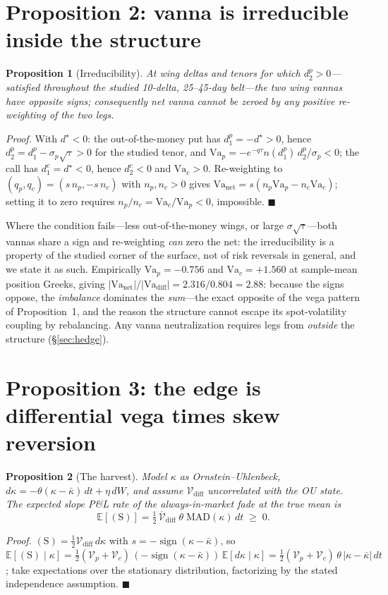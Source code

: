 \documentclass[11pt]{article}
\newcommand{\Va}{\mathrm{Va}}
\newtheorem{prop}{Proposition}
\begin{document}
\section{Proposition 2: vanna is irreducible inside the structure}
\begin{prop}[Irreducibility]
At wing deltas and tenors for which $d_2^p > 0$---satisfied throughout the studied 10-delta,
25--45-day belt---the two wing vannas have opposite signs; consequently net vanna cannot be
zeroed by any
positive re-weighting of the two legs.
\end{prop}
\emph{Proof.} With $d^\star < 0$: the out-of-the-money put has $d_1^p = -d^\star > 0$, hence
$d_2^p = d_1^p - \sigma_p\sqrt{\tau} > 0$ for the studied tenor, and
$\Va_p = -e^{-q\tau} n(d_1^p)\, d_2^p / \sigma_p < 0$; the call has $d_1^c = d^\star < 0$,
hence $d_2^c < 0$ and $\Va_c > 0$. Re-weighting to $(q_p, q_c) = (s\,n_p, -s\,n_c)$ with
$n_p, n_c > 0$ gives $\Va_{\mathrm{net}} = s(n_p \Va_p - n_c \Va_c)$; setting it to zero
requires $n_p / n_c = \Va_c / \Va_p < 0$, impossible. $\blacksquare$

Where the condition fails---less out-of-the-money wings, or large $\sigma\sqrt{\tau}$---both
vannas share a sign and re-weighting \emph{can} zero the net: the irreducibility is a property
of the studied corner of the surface, not of risk reversals in general, and we state it as
such. Empirically $\Va_p = -0.756$ and $\Va_c = +1.560$ at sample-mean position Greeks, giving
$|\Va_{\mathrm{net}}| / |\Va_{\mathrm{diff}}| = 2.316/0.804 = 2.88$: because the signs oppose, the
\emph{imbalance} dominates the \emph{sum}---the exact opposite of the vega pattern of
Proposition~1, and the reason the structure cannot escape its spot-volatility coupling by
rebalancing. Any vanna neutralization requires legs from \emph{outside} the structure
(\S\ref{sec:hedge}).

\section{Proposition 3: the edge is differential vega times skew reversion}
\begin{prop}[The harvest]
Model $\kappa$ as Ornstein--Uhlenbeck, $d\kappa = -\theta(\kappa - \bar\kappa)\,dt +
\eta\,dW$, and assume $\mathcal V_{\mathrm{diff}}$ uncorrelated with the OU state. The
expected slope P\&L rate of the always-in-market fade at the true mean is
\[ \mathbb E[(\mathrm S)] = \tfrac12\,\overline{\mathcal V}_{\mathrm{diff}}\;\theta\;
   \mathrm{MAD}(\kappa)\,dt \;\ge\; 0. \]
\end{prop}
\emph{Proof.} $(\mathrm S) = \tfrac12 \mathcal V_{\mathrm{diff}}\, d\kappa$ with
$s = -\operatorname{sign}(\kappa - \bar\kappa)$, so
$\mathbb E[(\mathrm S) \mid \kappa] = \tfrac12 (\mathcal V_p + \mathcal V_c)\,
(-\operatorname{sign}(\kappa - \bar\kappa))\, \mathbb E[d\kappa \mid \kappa] =
\tfrac12 (\mathcal V_p + \mathcal V_c)\, \theta\, |\kappa - \bar\kappa|\, dt$; take
expectations over the stationary distribution, factorizing by the stated independence
assumption. $\blacksquare$
\end{document}
